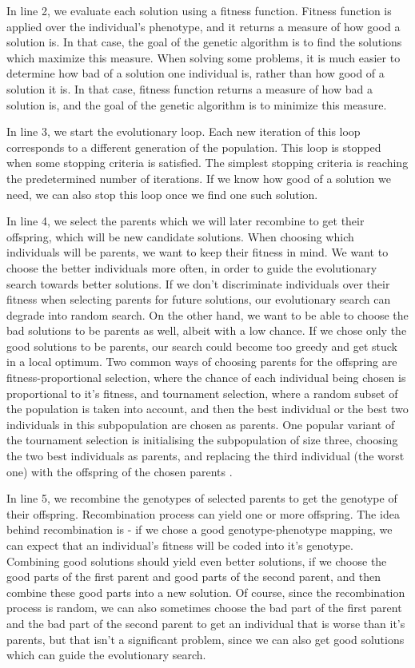 In line 2, we evaluate each solution using a fitness function. Fitness function is applied over the individual's phenotype, and it returns a measure of how good a solution is. In that case, the goal of the genetic algorithm is to find the solutions which maximize this measure. When solving some problems, it is much easier to determine how bad of a solution one individual is, rather than how good of a solution it is. In that case, fitness function returns a measure of how bad a solution is, and the goal of the genetic algorithm is to minimize this measure.

In line 3, we start the evolutionary loop. Each new iteration of this loop corresponds to a different generation of the population. This loop is stopped when some stopping criteria is satisfied. The simplest stopping criteria is reaching the predetermined number of iterations. If we know how good of a solution we need, we can also stop this loop once we find one such solution.  

In line 4, we select the parents which we will later recombine to get their offspring, which will be new candidate solutions. When choosing which individuals will be parents, we want to keep their fitness in mind. We want to choose the better individuals more often, in order to guide the evolutionary search towards better solutions. If we don't discriminate individuals over their fitness when selecting parents for future solutions, our evolutionary search can degrade into random search. On the other hand, we want to be able to choose the bad solutions to be parents as well, albeit with a low chance. If we chose only the good solutions to be parents, our search could become too greedy and get stuck in a local optimum. Two common ways of choosing parents for the offspring are fitness-proportional selection, where the chance of each individual being chosen is proportional to it's fitness, and tournament selection, where a random subset of the population is taken into account, and then the best individual or the best two individuals in this subpopulation are chosen as parents. One popular variant of the tournament selection is initialising the subpopulation of size three, choosing the two best individuals as parents, and replacing the third individual (the worst one) with the offspring of the chosen parents \citep{cupic2019evolucijskoracunarstvo}.

In line 5, we recombine the genotypes of selected parents to get the genotype of their offspring. Recombination process can yield one or more offspring. The idea behind recombination is - if we chose a good genotype-phenotype mapping, we can expect that an individual's fitness will be coded into it's genotype. Combining good solutions should yield even better solutions, if we choose the good parts of the first parent and good parts of the second parent, and then combine these good parts into a new solution. Of course, since the recombination process is random, we can also sometimes choose the bad part of the first parent and the bad part of the second parent to get an individual that is worse than it's parents, but that isn't a significant problem, since we can also get good solutions which can guide the evolutionary search.

